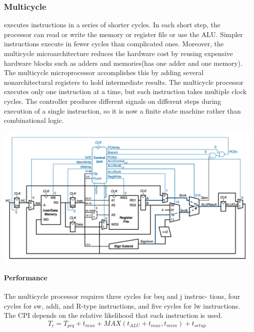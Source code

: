 		\subsubsection{Multicycle}
			executes instructions in a series of shorter cycles. In each short step, the processor can read or write the memory or register file or use the ALU. Simpler instructions execute in fewer cycles than complicated ones. Moreover, the multicycle microarchitecture reduces the hardware cost by reusing expensive hardware blocks such as adders and memories(has one adder and one memory). The multicycle microprocessor accomplishes this by adding several nonarchitectural registers to hold intermediate results. The multicycle processor executes only one instruction at a time, but each instruction takes multiple clock cycles. The controller produces different signals on different steps during execution of a single instruction, so it is now a finite state machine rather than combinational logic.
			\begin{center}
				\includegraphics[width = 15cm]{images/multi}
			\end{center}
			\paragraph{Performance}
			The multicycle processor requires three cycles for beq and j instruc- tions, four cycles for sw, addi, and R-type instructions, and five cycles for lw instructions. The CPI depends on the relative likelihood that each instruction is used.
			\begin{equation}
				T_c = T_{pcq} + t_{mux} + MAX(t_{ALU}+ t_{mux}, t_{mem})+ t_{setup}
			\end{equation}
